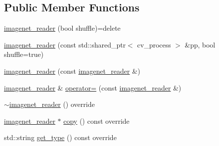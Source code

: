 \subsection*{Public Member Functions}
\begin{DoxyCompactItemize}
\item 
\hyperlink{classlbann_1_1imagenet__reader_a642331b94cdc3caad8335d65d096141c}{imagenet\+\_\+reader} (bool shuffle)=delete
\item 
\hyperlink{classlbann_1_1imagenet__reader_abf46c9cf51a7e046173a0046fb0ad08a}{imagenet\+\_\+reader} (const std\+::shared\+\_\+ptr$<$ cv\+\_\+process $>$ \&pp, bool shuffle=true)
\item 
\hyperlink{classlbann_1_1imagenet__reader_a18939cd7962491c30dc857622bad9666}{imagenet\+\_\+reader} (const \hyperlink{classlbann_1_1imagenet__reader}{imagenet\+\_\+reader} \&)
\item 
\hyperlink{classlbann_1_1imagenet__reader}{imagenet\+\_\+reader} \& \hyperlink{classlbann_1_1imagenet__reader_a5ea15cc16aa679a2cb549b44eb77f323}{operator=} (const \hyperlink{classlbann_1_1imagenet__reader}{imagenet\+\_\+reader} \&)
\item 
\hyperlink{classlbann_1_1imagenet__reader_a5a4ef2ba813d1a68890532e1a42bdcba}{$\sim$imagenet\+\_\+reader} () override
\item 
\hyperlink{classlbann_1_1imagenet__reader}{imagenet\+\_\+reader} $\ast$ \hyperlink{classlbann_1_1imagenet__reader_a71be5220be24de5caf00d2e422b750f2}{copy} () const override
\item 
std\+::string \hyperlink{classlbann_1_1imagenet__reader_a0afea0db8b4286b56211842f8f1d7678}{get\+\_\+type} () const override
\end{DoxyCompactItemize}
